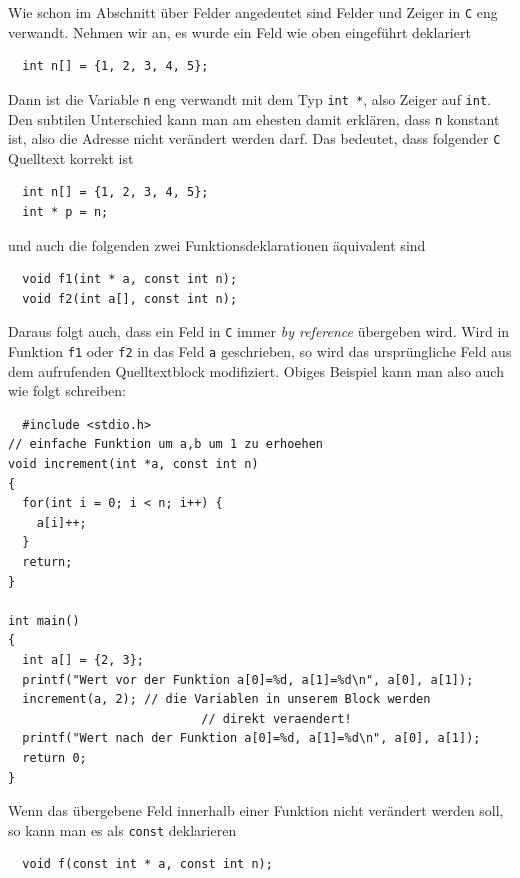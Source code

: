 Wie schon im Abschnitt über Felder angedeutet sind Felder und Zeiger in \texttt{C} eng verwandt.
Nehmen wir an, es wurde ein Feld wie oben eingeführt deklariert
\begin{lstlisting}
  int n[] = {1, 2, 3, 4, 5};
\end{lstlisting}
Dann ist die Variable \verb|n| eng verwandt mit dem Typ \verb|int *|, also Zeiger auf \verb|int|.
Den subtilen Unterschied kann man am ehesten damit erklären, dass \verb|n| konstant ist, also die Adresse nicht verändert werden darf.
Das bedeutet, dass folgender \texttt{C} Quelltext korrekt ist
\begin{lstlisting}
  int n[] = {1, 2, 3, 4, 5};
  int * p = n;
\end{lstlisting}
und auch die folgenden zwei Funktionsdeklarationen äquivalent sind
\begin{lstlisting}
  void f1(int * a, const int n);
  void f2(int a[], const int n);
\end{lstlisting}
Daraus folgt auch, dass ein Feld in \texttt{C} immer \emph{by reference} übergeben wird.
Wird in Funktion \texttt{f1} oder \texttt{f2} in das Feld \texttt{a} geschrieben, so wird das ursprüngliche Feld aus dem aufrufenden Quelltextblock modifiziert.
Obiges Beispiel kann man also auch wie folgt schreiben:
\begin{lstlisting}
  #include <stdio.h>
// einfache Funktion um a,b um 1 zu erhoehen
void increment(int *a, const int n)
{
  for(int i = 0; i < n; i++) {
    a[i]++;
  }
  return;
}

int main()
{
  int a[] = {2, 3};
  printf("Wert vor der Funktion a[0]=%d, a[1]=%d\n", a[0], a[1]);
  increment(a, 2); // die Variablen in unserem Block werden
                           // direkt veraendert!
  printf("Wert nach der Funktion a[0]=%d, a[1]=%d\n", a[0], a[1]);
  return 0;
}
\end{lstlisting}
Wenn das übergebene Feld innerhalb einer Funktion nicht verändert werden soll, so kann man es als \verb|const| deklarieren 
\begin{lstlisting}
  void f(const int * a, const int n);
\end{lstlisting}

